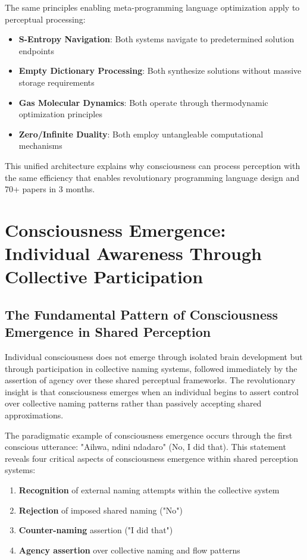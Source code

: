 \documentclass[12pt]{article}
\begin{document}
The same principles enabling meta-programming language optimization apply to perceptual processing:

\begin{itemize}
\item \textbf{S-Entropy Navigation}: Both systems navigate to predetermined solution endpoints
\item \textbf{Empty Dictionary Processing}: Both synthesize solutions without massive storage requirements  
\item \textbf{Gas Molecular Dynamics}: Both operate through thermodynamic optimization principles
\item \textbf{Zero/Infinite Duality}: Both employ untangleable computational mechanisms
\end{itemize}

This unified architecture explains why consciousness can process perception with the same efficiency that enables revolutionary programming language design and 70+ papers in 3 months.

\section{Consciousness Emergence: Individual Awareness Through Collective Participation}

\subsection{The Fundamental Pattern of Consciousness Emergence in Shared Perception}

Individual consciousness does not emerge through isolated brain development but through participation in collective naming systems, followed immediately by the assertion of agency over these shared perceptual frameworks. The revolutionary insight is that consciousness emerges when an individual begins to assert control over collective naming patterns rather than passively accepting shared approximations.

The paradigmatic example of consciousness emergence occurs through the first conscious utterance: "Aihwa, ndini ndadaro" (No, I did that). This statement reveals four critical aspects of consciousness emergence within shared perception systems:

\begin{enumerate}
\item \textbf{Recognition} of external naming attempts within the collective system
\item \textbf{Rejection} of imposed shared naming ("No")
\item \textbf{Counter-naming} assertion ("I did that")
\item \textbf{Agency assertion} over collective naming and flow patterns
\end{enumerate}
\end{document}
